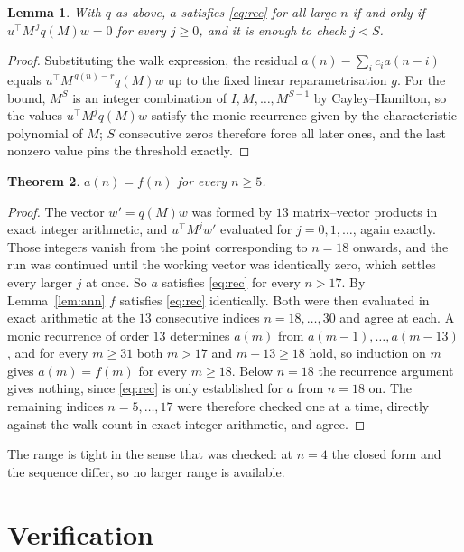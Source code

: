 \documentclass[11pt,a4paper]{article}
\theoremstyle{plain}
\newtheorem{theorem}{Theorem}
\newtheorem{lemma}[theorem]{Lemma}
\theoremstyle{definition}
\begin{document}
\begin{lemma}\label{lem:crit}
With $q$ as above, $a$ satisfies \eqref{eq:rec} for all large $n$ if and only if
$u^{\!\top}M^{\,j}q(M)w=0$ for every $j\ge0$, and it is enough to check $j<S$.
\end{lemma}

\begin{proof}
Substituting the walk expression, the residual $a(n)-\sum_ic_ia(n-i)$ equals
$u^{\!\top}M^{\,g(n)-r}q(M)w$ up to the fixed linear reparametrisation $g$. For the bound,
$M^{S}$ is an integer combination of $I,M,\dots,M^{S-1}$ by Cayley--Hamilton, so the values
$u^{\!\top}M^{j}q(M)w$ satisfy the monic recurrence given by the characteristic polynomial of
$M$; $S$ consecutive zeros therefore force all later ones, and the last nonzero value pins the
threshold exactly.
\end{proof}

\begin{theorem}
$a(n)=f(n)$ for every $n\ge5$.
\end{theorem}

\begin{proof}
The vector $w'=q(M)w$ was formed by $13$ matrix--vector products in exact integer
arithmetic, and $u^{\!\top}M^{j}w'$ evaluated for $j=0,1,\dots$, again exactly. Those integers
vanish from the point corresponding to $n=18$ onwards, and the run was continued until the
working vector was identically zero, which settles every larger $j$ at once. So $a$ satisfies
\eqref{eq:rec} for every $n>17$. By Lemma~\ref{lem:ann} $f$ satisfies \eqref{eq:rec}
identically. Both were then evaluated in exact arithmetic at the $13$ consecutive indices
$n=18,\dots,30$ and agree at each. A monic recurrence of order $13$
determines $a(m)$ from $a(m-1),\dots,a(m-13)$, and for every $m\ge31$ both
$m>17$ and $m-13\ge18$ hold, so induction on $m$ gives $a(m)=f(m)$ for every
$m\ge18$.
Below $n=18$ the recurrence argument gives nothing, since \eqref{eq:rec} is only
established for $a$ from $n=18$ on. The remaining indices $n=5,\dots,17$ were
therefore checked one at a time, directly against the walk count in exact integer arithmetic,
and agree.
\end{proof}

The range is tight in the sense that was checked: at $n=4$ the closed form and the sequence differ, so no larger range is available.

\section{Verification}
\end{document}
